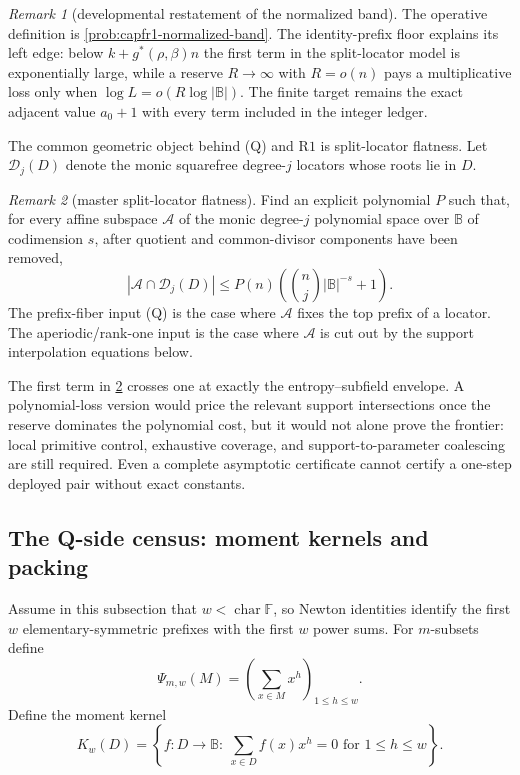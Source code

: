 \documentclass[11pt]{article}
\theoremstyle{definition}
\theoremstyle{remark}
\newtheorem{remark}[remark]{Remark}
\newcommand{\F}{\mathbb{F}}
\newcommand{\B}{\mathbb{B}}
\providecommand{\Dloc}{\mathcal D}
\providecommand{\Rone}{\mathrm{R1}}
\begin{document}
\begin{remark}[developmental restatement of the normalized band]\label{rem:capfr1-normalized-band-dev}
The operative definition is \cref{prob:capfr1-normalized-band}.  The identity-prefix floor explains its left edge: below $k+g^*(\rho,\beta)n$ the first term in the split-locator model is exponentially large, while a reserve $R\to\infty$ with $R=o(n)$ pays a multiplicative loss only when $\log L=o(R\log|\B|)$.  The finite target remains the exact adjacent value $a_0+1$ with every term included in the integer ledger.
\end{remark}

The common geometric object behind \textup{(Q)} and \(\Rone\) is split-locator flatness.  Let \(\Dloc_j(D)\) denote the monic squarefree degree-\(j\) locators whose roots lie in \(D\).

\begin{remark}[master split-locator flatness]\label{prob:capfr1-master-flatness}
Find an explicit polynomial \(P\) such that, for every affine subspace \(\mathcal A\) of the monic degree-\(j\) polynomial space over \(\B\) of codimension \(s\), after quotient and common-divisor components have been removed,
\[
        |\mathcal A\cap\Dloc_j(D)|
        \le
        P(n)\left(\binom n j |\B|^{-s}+1\right).
\]
The prefix-fiber input \textup{(Q)} is the case where \(\mathcal A\) fixes the top prefix of a locator.  The aperiodic/rank-one input is the case where \(\mathcal A\) is cut out by the support interpolation equations below.
\end{remark}

The first term in \cref{prob:capfr1-master-flatness} crosses one at exactly the entropy--subfield envelope.  A polynomial-loss version would price the relevant support intersections once the reserve dominates the polynomial cost, but it would not alone prove the frontier: local primitive control, exhaustive coverage, and support-to-parameter coalescing are still required.  Even a complete asymptotic certificate cannot certify a one-step deployed pair without exact constants.

\subsection{The Q-side census: moment kernels and packing}\label{subsec:capfr1-Q-kernel}

Assume in this subsection that \(w<\operatorname{char}\F\), so Newton identities identify the first \(w\) elementary-symmetric prefixes with the first \(w\) power sums.  For \(m\)-subsets define
\[
        \Psi_{m,w}(M)=\left(\sum_{x\in M}x^h\right)_{1\le h\le w}.
\]
Define the moment kernel
\[
        K_w(D)=\left\{f:D\to\B:\ \sum_{x\in D} f(x)x^h=0\text{ for }1\le h\le w\right\}.
\]
\end{document}
